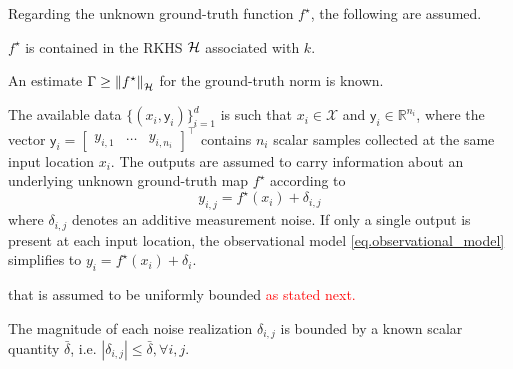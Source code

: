 Regarding the unknown ground-truth function $f^\star$, the following are assumed.

\begin{assumption}
	\label{as:rkhs_contains_gt}
	$f^\star$ is contained in the RKHS $\mathcal{H}$ associated with $k$.
\end{assumption}

\begin{assumption}
	An estimate $\Gamma \geq \left\| f^\star \right\|_\mathcal{H}$ for the ground-truth norm is known.
\end{assumption}


The available data $\{(x_i,\mathsf{y}_i)\}_{i=1}^d$ is such that $x_i \in \mathcal{X}$ and $\mathsf{y}_i \in \mathbb{R}^{n_i}$, where the vector $\mathsf{y}_i = \begin{bmatrix}y_{i,1} & \dots & y_{i,n_i} \end{bmatrix}^\top$ contains $n_i$ scalar samples collected at the same input location $x_i$. The outputs are assumed to carry information about an underlying unknown ground-truth map $f^\star$ according to
\begin{equation}
	\label{eq.observational_model}
	y_{i,j} = f^\star(x_i) + \delta_{i,j}
\end{equation}
where $\delta_{i,j}$ denotes an additive measurement noise. If only a single output is present at each input location, the observational model \eqref{eq.observational_model} simplifies to $y_{i} = f^\star(x_i) + \delta_{i}$.

 that is assumed to be uniformly bounded \textcolor{red}{as stated next.}

\begin{assumption}
	\label{as:noisebound}
	The magnitude of each noise realization $\delta_{i,j}$ is bounded by a known scalar quantity $\bar{\delta}$, i.e. $|\delta_{i,j}| \leq \bar \delta, \forall i,j$.
\end{assumption}

